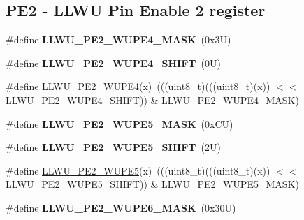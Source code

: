 \subsection*{P\+E2 -\/ L\+L\+WU Pin Enable 2 register}
\begin{DoxyCompactItemize}
\item 
\mbox{\label{group___l_l_w_u___register___masks_ga94128d26c60f13d22acf47200f4f37e0}} 
\#define {\bfseries L\+L\+W\+U\+\_\+\+P\+E2\+\_\+\+W\+U\+P\+E4\+\_\+\+M\+A\+SK}~(0x3\+U)
\item 
\mbox{\label{group___l_l_w_u___register___masks_ga12aa6ffb998e5273a8dd548ac434ad41}} 
\#define {\bfseries L\+L\+W\+U\+\_\+\+P\+E2\+\_\+\+W\+U\+P\+E4\+\_\+\+S\+H\+I\+FT}~(0\+U)
\item 
\#define \mbox{\hyperlink{group___l_l_w_u___register___masks_gadd7ab2866ab9683237ee5d6c003cf2aa}{L\+L\+W\+U\+\_\+\+P\+E2\+\_\+\+W\+U\+P\+E4}}(x)~(((uint8\+\_\+t)(((uint8\+\_\+t)(x)) $<$$<$ L\+L\+W\+U\+\_\+\+P\+E2\+\_\+\+W\+U\+P\+E4\+\_\+\+S\+H\+I\+FT)) \& L\+L\+W\+U\+\_\+\+P\+E2\+\_\+\+W\+U\+P\+E4\+\_\+\+M\+A\+SK)
\item 
\mbox{\label{group___l_l_w_u___register___masks_gacfb855231e7a1c11c64d8b4e951817be}} 
\#define {\bfseries L\+L\+W\+U\+\_\+\+P\+E2\+\_\+\+W\+U\+P\+E5\+\_\+\+M\+A\+SK}~(0x\+C\+U)
\item 
\mbox{\label{group___l_l_w_u___register___masks_ga4e823ada9bfc21dca4729eedf4e63778}} 
\#define {\bfseries L\+L\+W\+U\+\_\+\+P\+E2\+\_\+\+W\+U\+P\+E5\+\_\+\+S\+H\+I\+FT}~(2\+U)
\item 
\#define \mbox{\hyperlink{group___l_l_w_u___register___masks_ga956b7d4a8e1a041de809612c0cad83e3}{L\+L\+W\+U\+\_\+\+P\+E2\+\_\+\+W\+U\+P\+E5}}(x)~(((uint8\+\_\+t)(((uint8\+\_\+t)(x)) $<$$<$ L\+L\+W\+U\+\_\+\+P\+E2\+\_\+\+W\+U\+P\+E5\+\_\+\+S\+H\+I\+FT)) \& L\+L\+W\+U\+\_\+\+P\+E2\+\_\+\+W\+U\+P\+E5\+\_\+\+M\+A\+SK)
\item 
\mbox{\label{group___l_l_w_u___register___masks_ga0db50e96153e1ca74874da97d1c22f41}} 
\#define {\bfseries L\+L\+W\+U\+\_\+\+P\+E2\+\_\+\+W\+U\+P\+E6\+\_\+\+M\+A\+SK}~(0x30\+U)
\item 
\mbox{\label{group___l_l_w_u___register___masks_gaa7a0191eaf60166333a8bee953239c85}} 

\end{DoxyCompactItemize}
